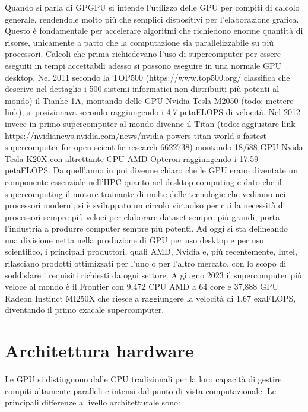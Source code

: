 Quando si parla di GPGPU si intende l'utilizzo delle GPU per compiti di calcolo generale, rendendole molto più che semplici dispositivi per l'elaborazione grafica. Questo è fondamentale per accelerare algoritmi che richiedono enorme quantità di risorse, unicamente a patto che la computazione sia parallelizzabile su più processori.
Calcoli che prima richiedevano l'uso di supercomputer per essere eseguiti in tempi accettabili adesso si possono eseguire in una normale GPU desktop. 
Nel 2011 secondo la TOP500 (https://www.top500.org/ classifica che descrive nel dettaglio i 500 sistemi informatici non distribuiti più potenti al mondo) il Tianhe-1A, montando delle GPU Nvidia Tesla M2050 (todo: mettere link), si posizionava secondo raggiungendo i 4.7 petaFLOPS di velocità. 
Nel 2012 invece in primo supercomputer al mondo divenne il Titan (todo: aggiustare link https://nvidianews.nvidia.com/news/nvidia-powers-titan-world-s-fastest-supercomputer-for-open-scientific-research-6622738) montando 18,688 GPU Nvida Tesla K20X con altrettante CPU AMD Opteron raggiungendo i 17.59 petaFLOPS.
Da quell'anno in poi divenne chiaro che le GPU erano diventate un componente essenziale nell'HPC quanto nel desktop computing e dato che il supercomputing il motore trainante di molte delle tecnologie che vediamo nei processori moderni, si è sviluppato un circolo virtuolso per cui la necessità di processori sempre più veloci per elaborare dataset sempre più grandi, porta l'industria a produrre computer sempre più potenti. Ad oggi si sta delineando una divisione netta nella produzione di GPU per uso desktop e per uso scientifico, i principali produttori, quali AMD, Nvidia e, più recentemente, Intel, rilasciano prodotti ottimizzati per l'uno o per l'altro mercato, con lo scopo di soddisfare i requisiti richiesti da ogni settore. A giugno 2023 il supercomputer più veloce al mondo è il Frontier con 9,472 CPU AMD a 64 core e 37,888 GPU Radeon Instinct MI250X che riesce a raggiungere la velocità di 1.67 exaFLOPS, diventando il primo exacale supercomputer. 


\section[Architettura hardware]{Architettura hardware}

Le GPU si distinguono dalle CPU tradizionali per la loro capacità di gestire compiti altamente paralleli e intensi dal punto di vista computazionale. Le principali differenze a livello architetturale sono: 

